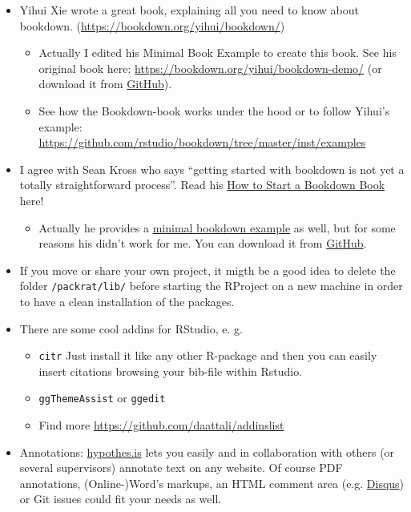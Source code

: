 \documentclass[]{book}
\providecommand{\tightlist}{%
  \setlength{\itemsep}{0pt}\setlength{\parskip}{0pt}}
\theoremstyle{definition}
\theoremstyle{definition}
\theoremstyle{remark}
\begin{document}
\begin{itemize}
\item
  Yihui Xie wrote a great book, explaining all you need to know about
  bookdown. (\url{https://bookdown.org/yihui/bookdown/})

  \begin{itemize}
  \tightlist
  \item
    Actually I edited his Minimal Book Example to create this book. See
    his original book here:
    \url{https://bookdown.org/yihui/bookdown-demo/} (or download it from
    \href{https://github.com/rstudio/bookdown-demo}{GitHub}).
  \item
    See how the Bookdown-book works under the hood or to follow Yihui's
    example:
    \url{https://github.com/rstudio/bookdown/tree/master/inst/examples}
  \end{itemize}
\item
  I agree with Sean Kross who says ``getting started with bookdown is
  not yet a totally straightforward process''. Read his
  \href{http://seankross.com/2016/11/17/How-to-Start-a-Bookdown-Book.html}{How
  to Start a Bookdown Book} here!

  \begin{itemize}
  \tightlist
  \item
    Actually he provides a
    \href{http://seankross.com/bookdown-start/diving-in.html}{minimal
    bookdown example} as well, but for some reasons his didn't work for
    me. You can download it from
    \href{https://github.com/seankross/bookdown-start}{GitHub}.
  \end{itemize}
\item
  If you move or share your own project, it migth be a good idea to
  delete the folder \texttt{/packrat/lib/} before starting the RProject
  on a new machine in order to have a clean installation of the
  packages.
\item
  There are some cool addins for RStudio, e. g.

  \begin{itemize}
  \tightlist
  \item
    \texttt{citr} Just install it like any other R-package and then you
    can easily insert citations browsing your bib-file within Rstudio.
  \item
    \texttt{ggThemeAssist} or \texttt{ggedit}
  \item
    Find more \url{https://github.com/daattali/addinslist}
  \end{itemize}
\item
  Annotations: \href{https://web.hypothes.is/}{hypothes.is} lets you
  easily and in collaboration with others (or several supervisors)
  annotate text on any website. Of course PDF annotations,
  (Online-)Word's markups, an HTML comment area (e.g.
  \href{https://disqus.com/}{Disqus}) or Git issues could fit your needs
  as well.
\end{itemize}
\end{document}
